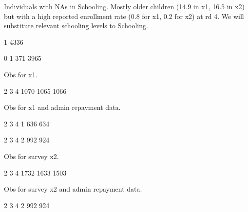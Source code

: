 Individuals with NAs in \textsf{Schooling}. Mostly older children (14.9 in \textsf{x1}, 16.5 in \textsf{x2}) but with a high reported enrollment rate (0.8 for \textsf{x1}, 0.2 for \textsf{x2}) at rd 4. We will substitute relevant schooling levels to \textsf{Schooling}.
\begin{Schunk}
\begin{Soutput}

   1 
4336 
\end{Soutput}
\begin{Soutput}

   0    1 
 371 3965 
\end{Soutput}
\end{Schunk}
Obs for \textsf{x1}.
\begin{Schunk}
\begin{Soutput}

   2    3    4 
1070 1065 1066 
\end{Soutput}
\end{Schunk}
Obs for \textsf{x1} and admin repayment data.
\begin{Schunk}
\begin{Soutput}

  2   3   4 
  1 636 634 
\end{Soutput}
\begin{Soutput}

  2   3   4 
  2 992 924 
\end{Soutput}
\end{Schunk}
Obs for survey \textsf{x2}.
\begin{Schunk}
\begin{Soutput}

   2    3    4 
1732 1633 1503 
\end{Soutput}
\end{Schunk}
Obs for survey \textsf{x2} and admin repayment data.
\begin{Schunk}
\begin{Soutput}

  2   3   4 
  2 992 924 
\end{Soutput}
\end{Schunk}
